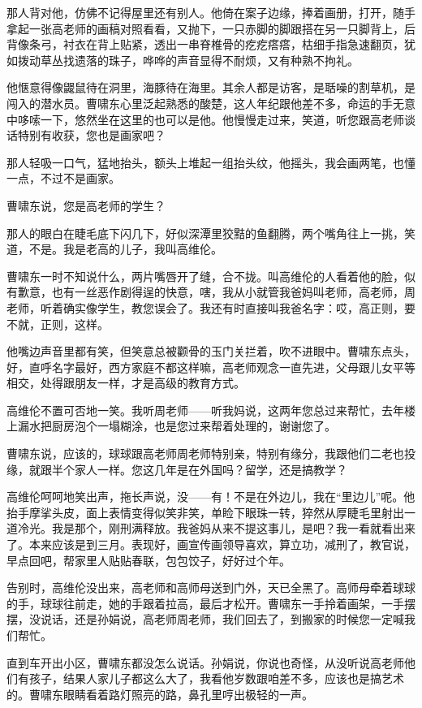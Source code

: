 \documentclass[lang=cn,newtx,12pt,scheme=chinese]{elegantbook}
\begin{document}
那人背对他，仿佛不记得屋里还有别人。他倚在案子边缘，捧着画册，打开，随手拿起一张高老师的画稿对照看看，又抛下，一只赤脚的脚跟搭在另一只脚背上，后背像条弓，衬衣在背上贴紧，透出一串脊椎骨的疙疙瘩瘩，枯细手指急速翻页，犹如拨动草丛找遗落的珠子，哗哗的声音显得不耐烦，又有种熟不拘礼。

他惬意得像鼹鼠待在洞里，海豚待在海里。其余人都是访客，是聒噪的割草机，是闯入的潜水员。曹啸东心里泛起熟悉的酸楚，这人年纪跟他差不多，命运的手无意中哆嗦一下，悠然坐在这里的也可以是他。他慢慢走过来，笑道，听您跟高老师谈话特别有收获，您也是画家吧？

那人轻吸一口气，猛地抬头，额头上堆起一组抬头纹，他摇头，我会画两笔，也懂一点，不过不是画家。

曹啸东说，您是高老师的学生？

那人的眼白在睫毛底下闪几下，好似深潭里狡黠的鱼翻腾，两个嘴角往上一挑，笑道，不是。我是老高的儿子，我叫高维伦。

曹啸东一时不知说什么，两片嘴唇开了缝，合不拢。叫高维伦的人看着他的脸，似有歉意，也有一丝恶作剧得逞的快意，嗐，我从小就管我爸妈叫老师，高老师，周老师，听着确实像学生，教您误会了。我还有时直接叫我爸名字：哎，高正则，要不就，正则，这样。

他嘴边声音里都有笑，但笑意总被颧骨的玉门关拦着，吹不进眼中。曹啸东点头，好，直呼名字最好，西方家庭不都这样嘛，高老师观念一直先进，父母跟儿女平等相交，处得跟朋友一样，才是高级的教育方式。

高维伦不置可否地一笑。我听周老师——听我妈说，这两年您总过来帮忙，去年楼上漏水把厨房泡个一塌糊涂，也是您过来帮着处理的，谢谢您了。

曹啸东说，应该的，球球跟高老师周老师特别亲，特别有缘分，我跟他们二老也投缘，就跟半个家人一样。您这几年是在外国吗？留学，还是搞教学？

高维伦呵呵地笑出声，拖长声说，没——有！不是在外边儿，我在“里边儿”呢。他抬手摩挲头皮，面上表情变得似笑非笑，单睑下眼珠一转，猝然从厚睫毛里射出一道冷光。我是那个，刚刑满释放。我爸妈从来不提这事儿，是吧？我一看就看出来了。本来应该是到三月。表现好，画宣传画领导喜欢，算立功，减刑了，教官说，早点回吧，帮家里人贴贴春联，包包饺子，好好过个年。

告别时，高维伦没出来，高老师和高师母送到门外，天已全黑了。高师母牵着球球的手，球球往前走，她的手跟着拉高，最后才松开。曹啸东一手拎着画架，一手摆摆，没说话，还是孙娟说，高老师周老师，我们回去了，到搬家的时候您一定喊我们帮忙。

直到车开出小区，曹啸东都没怎么说话。孙娟说，你说也奇怪，从没听说高老师他们有孩子，结果人家儿子都这么大了，我看他岁数跟咱差不多，应该也是搞艺术的。曹啸东眼睛看着路灯照亮的路，鼻孔里哼出极轻的一声。
\end{document}
